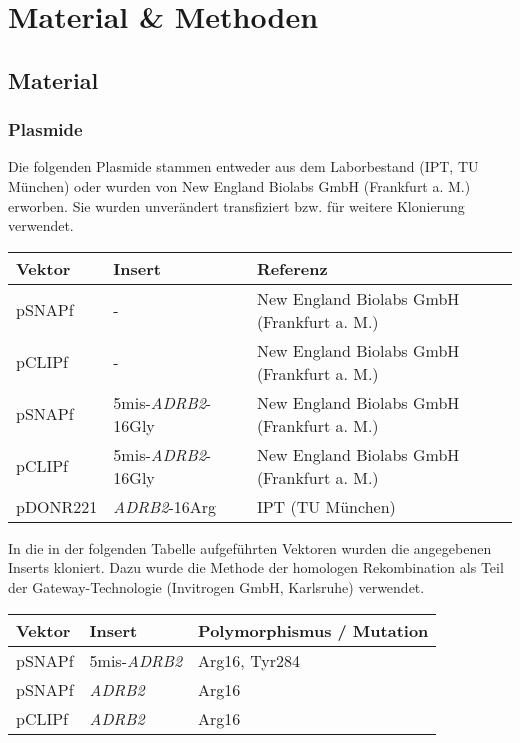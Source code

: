 \chapter{Material \& Methoden}\label{chapter:materialmethoden}

\section{Material}
\subsection{Plasmide} \label{plasmide}
Die folgenden Plasmide stammen entweder aus dem Laborbestand (IPT, TU München) oder wurden von New England Biolabs GmbH (Frankfurt a. M.) erworben. Sie wurden unverändert transfiziert bzw. für weitere Klonierung verwendet.

\begin{table}[htsb]
    \begin{tabularx}{\textwidth}{lll}
        \toprule
        Vektor		&	Insert						& 	Referenz	\\
        \midrule
        pSNAPf		&		-						&	New England Biolabs GmbH (Frankfurt a. M.)\\
        pCLIPf		&		-						&	New England Biolabs GmbH (Frankfurt a. M.)\\
        pSNAPf		&	5mis-\textit{ADRB2}-16Gly	&	New England Biolabs GmbH (Frankfurt a. M.)\\
        pCLIPf		&	5mis-\textit{ADRB2}-16Gly	&	New England Biolabs GmbH (Frankfurt a. M.)\\
        pDONR221	&	\textit{ADRB2}-16Arg	   		&	IPT (TU München)\\
    \bottomrule
    \end{tabularx}
\end{table}

In die in der folgenden Tabelle aufgeführten Vektoren wurden die angegebenen Inserts kloniert. Dazu wurde die Methode der homologen Rekombination als Teil der Gateway-Technologie (Invitrogen GmbH, Karlsruhe) verwendet.

\begin{table}[htsb]
\begin{tabularx}{\textwidth}{lll}
\toprule
Vektor		&	Insert		&	Polymorphismus / Mutation\\
\midrule
pSNAPf		&	5mis-\textit{ADRB2}	&	Arg16, Tyr284\\
pSNAPf		&	\textit{ADRB2}		&	Arg16\\
pCLIPf		&	\textit{ADRB2}		&	Arg16\\
\bottomrule
\end{tabularx}
\end{table}

